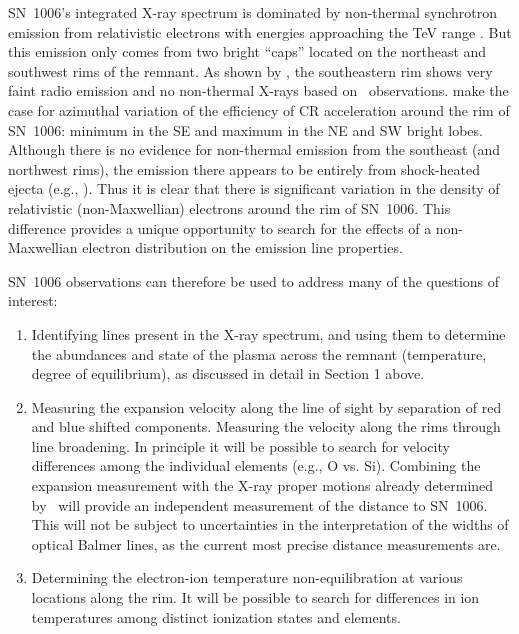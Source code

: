 \documentclass[11pt,a4paper]{article}
\begin{document}
{SN~1006's integrated X-ray spectrum is dominated by non-thermal
synchrotron emission from relativistic electrons with energies
approaching the TeV range \citep{koyama95}.  But this emission only
comes from two bright ``caps'' located on the northeast and southwest
rims of the remnant.  As shown by \citet{gamil08}, the southeastern
rim shows very faint radio emission and no non-thermal X-rays based on
\chandra\ observations.  \citet{gamil08} make the case for azimuthal
variation of the efficiency of CR acceleration around the rim of
SN~1006: minimum in the SE and maximum in the NE and SW bright lobes.
Although there is no evidence for non-thermal emission from the
southeast (and northwest rims), the emission there appears to be
entirely from shock-heated ejecta (e.g., \citealt{katsuda13}).  Thus
it is clear that there is significant variation in the density of
relativistic (non-Maxwellian) electrons around the rim of SN~1006.
This difference provides a unique opportunity to search for the
effects of a non-Maxwellian electron distribution on the emission line
properties.

SN~1006 observations can therefore be used to address many of the
questions of interest:
\begin{enumerate}

\item Identifying lines present in the X-ray spectrum, and using them
  to determine the abundances and state of the plasma across the
  remnant (temperature, degree of equilibrium), as discussed in detail
  in Section 1 above.

\item Measuring the expansion velocity along the line of sight by
  separation of red and blue shifted components.  Measuring the
  velocity along the rims through line broadening.  In principle it
  will be possible to search for velocity differences among the
  individual elements (e.g., O vs. Si).  Combining the expansion
  measurement with the X-ray proper motions already determined by
  \chandra\ will provide an independent measurement of the distance to
  SN~1006. This will not be subject to uncertainties in the
  interpretation of the widths of optical Balmer lines, as the current
  most precise distance measurements are.

\item Determining the electron-ion temperature non-equilibration at
  various locations along the rim.  It will be possible to search for
  differences in ion temperatures among distinct ionization states and
  elements.


\end{enumerate}}
\end{document}
